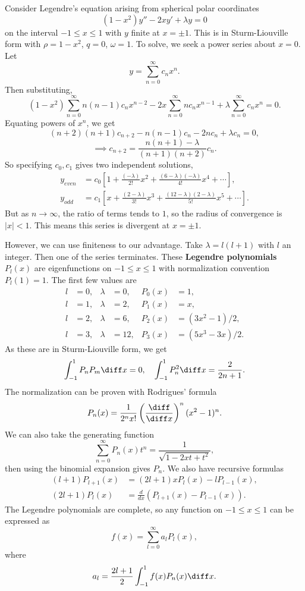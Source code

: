 \documentclass[12pt]{article}
\begin{document}
Consider Legendre's equation arising from spherical polar coordinates
\[
	(1 - x^2)y'' - 2xy' + \lambda y = 0
\]
on the interval $-1 \leq x \leq 1$ with $y$ finite at $x = \pm 1$. This is in Sturm-Liouville form with $\rho = 1-x^2$, $q = 0$, $\omega = 1$. To solve, we seek a power series about $x = 0$. Let
\[
y = \sum_{n = 0}^{\infty} c_n x^{n}
.\]
Then substituting,
\[
	(1 - x^2)\sum_{n = 0}^{\infty} n(n-1) c_n x^{n-2} - 2x \sum_{n = 0}^{\infty} n c_n x^{n-1} + \lambda \sum_{n = 0}^{\infty} c_n x^{n} = 0
.\]
Equating powers of $x^{n}$, we get
\[
	(n+2)(n+1)c_{n+2} - n(n-1)c_n - 2n c_n + \lambda c_n = 0
,\]
\[
	\implies c_{n+2} = \frac{n(n+1) - \lambda}{(n+1)(n+2)} c_n
.\]
So specifying $c_0, c_1$ gives two independent solutions,
\begin{align*}
	y_{even} &= c_0 \left[ 1 + \frac{(-\lambda)}{2!}x^2 + \frac{(6 - \lambda)(-\lambda)}{4!}x^{4} + \cdots \right], \\
	y_{odd} &= c_1 \left[x + \frac{(2 - \lambda)}{3!}x^3 + \frac{(12 - \lambda)(2 - \lambda)}{5!}x^{5} + \cdots \right].
\end{align*}
But as $n \to \infty$, the ratio of terms tends to $1$, so the radius of convergence is $|x| < 1$. This means this series is divergent at $x = \pm 1$.

However, we can use finiteness to our advantage. Take $\lambda = l(l+1)$ with $l$ an integer. Then one of the series terminates. These \textbf{Legendre polynomials} $P_l(x)$ are eigenfunctions on $-1 \leq x \leq 1$ with normalization convention $P_l(1) = 1$. The first few values are
\begin{align*}
	l &= 0, & \lambda &= 0, & P_0(x) &= 1, \\
	l &= 1, & \lambda &= 2, & P_1(x) &= x, \\
	l &= 2, & \lambda &= 6, & P_2(x) &= (3x^2-1)/2, \\
	l &= 3, & \lambda &= 12, & P_3(x) &= (5x^3 - 3x)/2.
\end{align*}
As these are in Sturm-Liouville form, we get
\[
\int_{-1}^{1}P_n P_m\diff x = 0, \quad \int_{-1}^{1}P_n^2\diff x = \frac{2}{2n+1}
.\]
The normalization can be proven with Rodrigues' formula
\[
	P_n(x) = \frac{1}{2^{n}x!} \left( \frac{\diff}{\diff x} \right)^{n} (x^2 - 1)^{n}
.\]
We can also take the generating function
\[
	\sum_{n = 0}^{\infty} P_n(x)t^{n} = \frac{1}{\sqrt{1 - 2xt + t^2}}
,\]
then using the binomial expansion gives $P_n$. We also have recursive formulas
\begin{align*}
	(l+1)P_{l+1}(x) &= (2l+1)xP_l(x) - lP_{l-1}(x), \\
	(2l+1)P_{l}(x) &= \frac{d}{dx} (P_{l+1}(x) - P_{l-1}(x)).
\end{align*}
The Legendre polynomials are complete, so any function on $-1 \leq x \leq 1$ can be expressed as
\[
	f(x) = \sum_{l = 0}^{\infty} a_l P_l(x)
,\]
where
\[
	a_l = \frac{2l+1}{2} \int_{-1}^{1}f(x) P_n(x)\diff x
.\]
\end{document}
